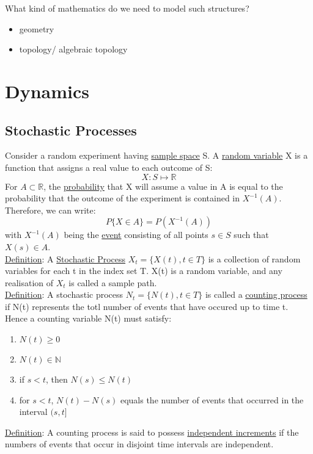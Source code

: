 \documentclass[11pt]{book}
\begin{document}
What kind of mathematics do we need to model such structures?\begin{itemize}
\item geometry
\item topology/ algebraic topology
\end{itemize}

\chapter{Dynamics}

\section{Stochastic Processes}
Consider a random experiment having \underline{sample space} S. A \underline{random variable} X is a function that assigns a real value to each outcome of S: $$X:S \mapsto \mathbb{R}$$
For $A \subset \mathbb{R}$, the \underline{probability} that X will assume a value in A is equal to the probability that the outcome of the experiment is contained in $X^{-1}(A)$. Therefore, we can write: $$P\{X \in A \} = P(X^{-1}(A))$$
with $X^{-1}(A)$ being the \underline{event} consisting of all points $s \in S$ such that $X(s) \in A$.\\

\underline{Definition}: A \underline{Stochastic Process} $X_{t} = \{X(t), t \in T \}$ is a collection of random variables for each t in the index set T. X(t) is a random variable, and any realisation of $X_{t}$ is called a sample path.\\

\underline{Definition}: A stochastic process $N_{t} = \{N(t), t \in T \}$ is called a \underline{counting process} if N(t) represents the totl number of events that have occured up to time t.\\

Hence a counting variable N(t) must satisfy:
\begin{enumerate}
\item $N(t) \geq 0$
\item $N(t) \in \mathbb{N}$
\item if $s<t$, then $N(s) \leq N(t)$
\item for $s<t$, $N(t)- N(s)$ equals the number of events that occurred in the interval $(s,t]$ 
\end{enumerate}
\underline{Definition}: A counting process is said to possess \underline{independent increments} if the numbers of events that occur in disjoint time intervals are independent.\\
\end{document}
